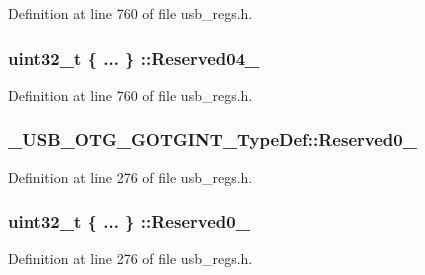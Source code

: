 Definition at line 760 of file usb\-\_\-regs.\-h.

\hypertarget{group___u_s_b___o_t_g___d_r_i_v_e_r_gac3fedf9fd76ba980b6480e6b817c12d0}{
\subsubsection[{Reserved04\-\_\-31}]{\setlength{\rightskip}{0pt plus 5cm}uint32\-\_\-t \{ ... \} \-::Reserved04\-\_}}\label{group___u_s_b___o_t_g___d_r_i_v_e_r_gac3fedf9fd76ba980b6480e6b817c12d0}


Definition at line 760 of file usb\-\_\-regs.\-h.

\hypertarget{group___u_s_b___o_t_g___d_r_i_v_e_r_gaa27cf9c3b6dabb69c2e2c1bf48655e7d}{
\subsubsection[{Reserved0\-\_\-1}]{ \-\_\-\-U\-S\-B\-\_\-\-O\-T\-G\-\_\-\-G\-O\-T\-G\-I\-N\-T\-\_\-\-Type\-Def\-::\-Reserved0\-\_}}\label{group___u_s_b___o_t_g___d_r_i_v_e_r_gaa27cf9c3b6dabb69c2e2c1bf48655e7d}


Definition at line 276 of file usb\-\_\-regs.\-h.

\hypertarget{group___u_s_b___o_t_g___d_r_i_v_e_r_gaf39f8af6529e56d2a7844d8cc1938719}{
\subsubsection[{Reserved0\-\_\-1}]{\setlength{\rightskip}{0pt plus 5cm}uint32\-\_\-t \{ ... \} \-::Reserved0\-\_}}\label{group___u_s_b___o_t_g___d_r_i_v_e_r_gaf39f8af6529e56d2a7844d8cc1938719}


Definition at line 276 of file usb\-\_\-regs.\-h.

